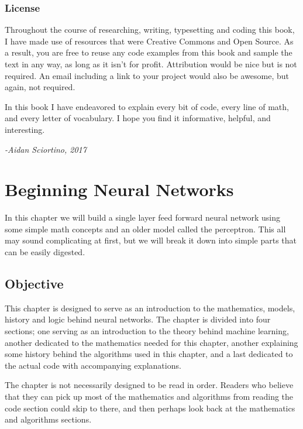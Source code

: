 \documentclass{memoir}
\begin{document}
  \subsection{License}
    Throughout the course of researching, writing, typesetting and coding this book, I have made use of resources that were Creative Commons and Open Source. As a result, you are free to reuse any code examples from this book and sample the text in any way, as long as it isn't for profit. Attribution would be nice but is not required. An email including a link to your project would also be awesome, but again, not required.

    \vspace{0.5em}

In this book I have endeavored to explain every bit of code, every line of math, and every letter of vocabulary. I hope you find it informative, helpful, and interesting.
  \begin{flushright}\emph{-Aidan Sciortino, 2017}\end{flushright}

\chapter{Beginning Neural Networks}
In this chapter we will build a single layer feed forward neural network using some simple math concepts and an older model called the perceptron. This all may sound complicating at first, but we will break it down into simple parts that can be easily digested.
\section{Objective}
This chapter is designed to serve as an introduction to the mathematics, models, history and logic behind neural networks. The chapter is divided into four sections; one serving as an introduction to the theory behind machine learning, another dedicated to the mathematics needed for this chapter, another explaining some history behind the algorithms used in this chapter, and a last dedicated to the actual code with accompanying explanations.

The chapter is not necessarily designed to be read in order. Readers who believe that they can pick up most of the mathematics and algorithms from reading the code section could skip to there, and then perhaps look back at the mathematics and algorithms sections.
\clearpage
\end{document}
